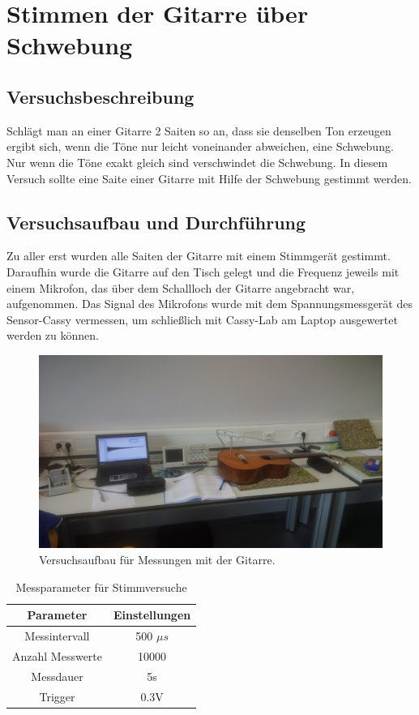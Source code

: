 \documentclass[12pt,a4paper]{article}
\author{Gruppe C14 \\ Julián Häck, Martin Koytek, Lars Wenning, Erik Zimmermann}
\begin{document}
\section{Stimmen der Gitarre über Schwebung}
\subsection{Versuchsbeschreibung}
Schlägt man an einer Gitarre 2 Saiten so an, dass sie denselben Ton erzeugen ergibt sich, wenn die Töne nur leicht voneinander abweichen, eine Schwebung. Nur wenn die Töne exakt gleich sind verschwindet die Schwebung. \newline
In diesem Versuch sollte eine Saite einer Gitarre mit Hilfe der Schwebung gestimmt werden.
\subsection{Versuchsaufbau und Durchführung}

Zu aller erst wurden alle Saiten der Gitarre mit einem Stimmgerät gestimmt.  \newline
Daraufhin wurde die Gitarre auf den Tisch gelegt und die Frequenz jeweils mit einem Mikrofon, das über dem Schallloch der Gitarre angebracht war, aufgenommen. Das Signal des Mikrofons wurde mit dem Spannungsmessgerät des Sensor-Cassy vermessen, um schließlich mit Cassy-Lab am Laptop ausgewertet werden zu können.

\begin{figure}[H]
\centering
\includegraphics[scale=0.1]{Bilder/IMG_20160323_123920.jpg}
\caption{Versuchsaufbau für Messungen mit der Gitarre. }
\end{figure}


\begin{table}[H]\centering
\caption{Messparameter für Stimmversuche}
\begin{tabular}{c|c}
Parameter & Einstellungen \\ 
\hline
Messintervall & 500 $\mu s$ \\ 
Anzahl Messwerte & 10000 \\ 
Messdauer & 5s \\ 
Trigger & 0.3V \\ 
\end{tabular}
\end{table}
 
\end{document}

